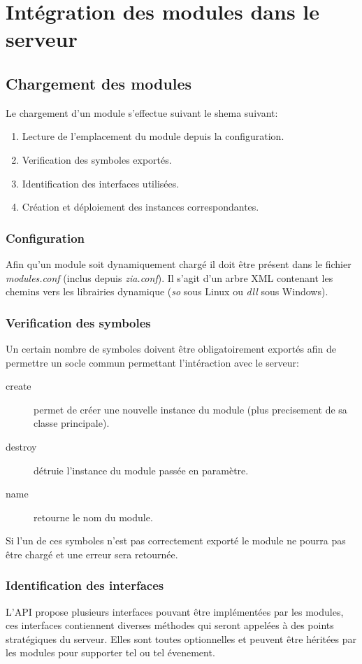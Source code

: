 \chapter{Intégration des modules dans le serveur}
\section{Chargement des modules}
    Le chargement d'un module s'effectue suivant le shema suivant:
    \begin{enumerate}
        \item Lecture de l'emplacement du module depuis la configuration.
        \item Verification des symboles exportés.
        \item Identification des interfaces utilisées.
        \item Création et déploiement des instances correspondantes.
    \end{enumerate}
    
    \subsection{Configuration}
    Afin qu'un module soit dynamiquement chargé il doit être présent dans le fichier \textit{modules.conf} (inclus depuis \textit{zia.conf}). Il s'agit d'un arbre XML contenant les chemins vers les librairies dynamique (\textit{so} sous Linux ou \textit{dll} sous Windows).
    
    \subsection{Verification des symboles}
    Un certain nombre de symboles doivent être obligatoirement exportés afin de permettre un socle commun permettant l'intéraction avec le serveur:
    \begin{description}
        \item[create] permet de créer une nouvelle instance du module (plus precisement de sa classe principale).
        \item[destroy] détruie l'instance du module passée en paramètre.
        \item[name] retourne le nom du module.
    \end{description}
    Si l'un de ces symboles n'est pas correctement exporté le module ne pourra pas être chargé et une erreur sera retournée.

    \subsection{Identification des interfaces}
    L'API propose plusieurs interfaces pouvant être implémentées par les modules, ces interfaces contiennent diverses méthodes qui seront appelées à des points stratégiques du serveur. Elles sont toutes optionnelles et peuvent être héritées par les modules pour supporter tel ou tel évenement.


